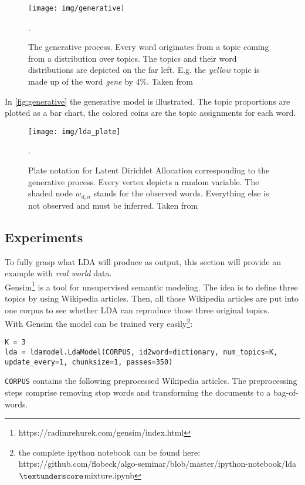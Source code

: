 \documentclass[a4paper,ngerman, english]{atseminar}
\begin{document}
\begin{figure}[H]
\centering
\texttt{[image: img/generative]}
\caption{The generative process. Every word originates from a topic coming from a distribution over topics.
The topics and their word distributions are depicted on the far left. E.g. the \textit{yellow} topic is made up of 
the word \textit{gene} by $4\%$. Taken from \cite{blei2012probabilistic}}.
  \label{fig:generative}
\end{figure}

In \autoref{fig:generative} the generative model is illustrated. The topic proportions are plotted
as a bar chart, the colored coins are the topic assignments for each word.



\begin{figure}[H]
\centering
\texttt{[image: img/lda\_plate]}
 \caption{Plate notation for Latent Dirichlet Allocation corresponding to the generative process. Every vertex depicts a random variable.
 The shaded node $w_{d,n}$ stands for the observed words. Everything else is not observed and must be inferred. Taken from \cite{blei2012probabilistic}}.
  \label{fig:lda_plate}
\end{figure}

\subsection{Experiments}
To fully grasp what LDA will produce as output, this section will provide an example with 
\textit{real world} data. \\
Gensim\footnote{ https://radimrehurek.com/gensim/index.html } is a tool for unsupervised semantic modeling.
The idea is to define three topics by using Wikipedia articles. Then, all those Wikipedia articles are
put into one corpus to see whether LDA can reproduce those three original topics.
\\
With Gensim the model can be trained very easily\footnote{the complete ipython notebook can be found here: https://github.com/flobeck/algo-seminar/blob/master/ipython-notebook/lda$\textunderscore$mixture.ipynb}: \\
\begin{lstlisting}[label=noam,caption=\; Query for a document]
K = 3
lda = ldamodel.LdaModel(CORPUS, id2word=dictionary, num_topics=K, 
update_every=1, chunksize=1, passes=350)
\end{lstlisting}

\texttt{CORPUS} contains the following preprocessed Wikipedia articles. The preprocessing steps comprise removing stop words and
transforming the documents to a bag-of-words.
\vspace{1.3cm}
\end{document}
